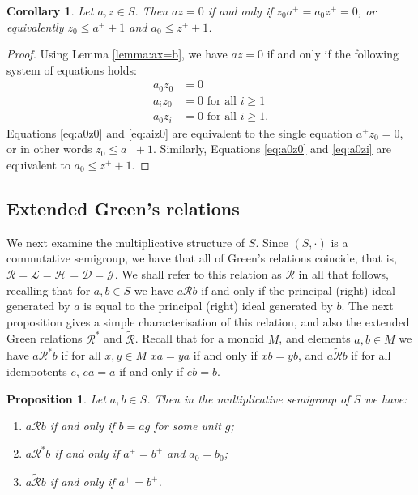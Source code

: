\documentclass[a4paper, 11pt]{article}
\theoremstyle{plain}
\newtheorem{corollary}  [theorem]{Corollary}
\newtheorem{proposition}[theorem]{Proposition}
\theoremstyle{definition}
\begin{document}
\begin{corollary} \label{corollary:az=0}
Let $a,z \in S$. Then $az = 0$ if and only if $z_0 a^+ = a_0 z^+ = 0$, or equivalently $z_0 \le a^+ + 1$ and $a_0 \le z^+ + 1$.
\end{corollary}

\begin{proof}
Using Lemma \ref{lemma:ax=b}, we have $az = 0$ if and only if the following system of equations holds:
\begin{align}
    \label{eq:a0z0}
    a_0 z_0 &= 0 \\
    \label{eq:aiz0}
    a_i z_0 &= 0 \text{ for all } i \ge 1\\
    \label{eq:a0zi}
    a_0 z_i &= 0 \text{ for all } i \ge 1.
\end{align}
Equations \eqref{eq:a0z0} and \eqref{eq:aiz0} are equivalent to the single equation $a^+ z_0 = 0$,
or in other words $z_0 \le a^+ + 1$. Similarly, Equations \eqref{eq:a0z0} and \eqref{eq:a0zi} are equivalent to $a_0 \le z^+ + 1$.
\end{proof}





\subsection{Extended Green's relations} \label{subsection:Green}

We next examine the multiplicative structure of $S$. Since $(S, \cdot)$ is a commutative semigroup, we have that all of Green's relations \cite{How95} coincide, that is, $\mathcal{R}=\mathcal{L}=\mathcal{H}=\mathcal{D} = \mathcal{J}$. We shall refer to this relation as $\mathcal{R}$ in all that follows, recalling that for $a,b \in S$ we have $a \mathcal{R} b$ if and only if the principal (right) ideal generated by $a$ is equal to the principal (right) ideal generated by $b$. The next proposition gives a simple characterisation of this relation, and also the extended Green relations $\mathcal{R}^*$ and $\tilde{\mathcal{R}}$. 
Recall that  for a monoid $M$, and elements $a,b \in M$ we have $a \mathcal{R}^*b$ if for all $x, y \in M$ $xa = ya$ if and only if $xb = yb$, and $a \mathcal{ \tilde{R} } b$ if for all idempotents $e$, $ea = a$ if and only if $eb = b$.


\begin{proposition}
\label{prop:green}
Let $a,b \in S$. Then  in the multiplicative semigroup of $S$ we have:
\begin{enumerate}
\item \label{item:R} $a \mathcal{R} b$ if and only if $b=ag$ for some unit $g$;

\item \label{item:Rstar} $a \mathcal{R}^* b$ if and only if $a^+ = b^+$ and $a_0=b_0$;

\item \label{item:Rtilde} $a \tilde{\mathcal{R}} b$ if and only if $a^+ = b^+$.
\end{enumerate}
\end{proposition}
\end{document}
